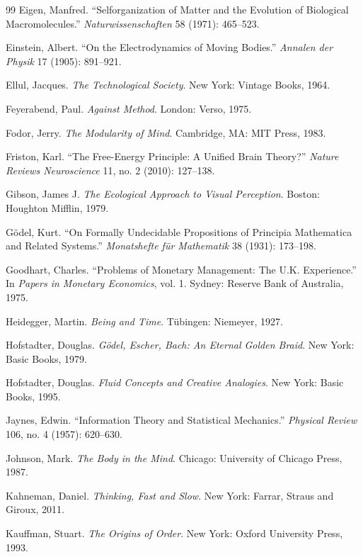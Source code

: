 \documentclass[12pt,openany]{book}
\theoremstyle{plain}
\theoremstyle{definition}
\theoremstyle{remark}
\begin{document}
\begin{thebibliography}{99}
Eigen, Manfred.
``Selforganization of Matter and the Evolution of Biological Macromolecules.''
\textit{Naturwissenschaften} 58 (1971): 465--523.

Einstein, Albert.
``On the Electrodynamics of Moving Bodies.''
\textit{Annalen der Physik} 17 (1905): 891--921.

Ellul, Jacques.
\textit{The Technological Society}.
New York: Vintage Books, 1964.

Feyerabend, Paul.
\textit{Against Method}.
London: Verso, 1975.

Fodor, Jerry.
\textit{The Modularity of Mind}.
Cambridge, MA: MIT Press, 1983.

Friston, Karl.
``The Free-Energy Principle: A Unified Brain Theory?''
\textit{Nature Reviews Neuroscience} 11, no. 2 (2010): 127--138.

Gibson, James J.
\textit{The Ecological Approach to Visual Perception}.
Boston: Houghton Mifflin, 1979.

Gödel, Kurt.
``On Formally Undecidable Propositions of Principia Mathematica and Related Systems.''
\textit{Monatshefte für Mathematik} 38 (1931): 173--198.

Goodhart, Charles.
``Problems of Monetary Management: The U.K. Experience.''
In \textit{Papers in Monetary Economics}, vol. 1.
Sydney: Reserve Bank of Australia, 1975.

Heidegger, Martin.
\textit{Being and Time}.
Tübingen: Niemeyer, 1927.

Hofstadter, Douglas.
\textit{Gödel, Escher, Bach: An Eternal Golden Braid}.
New York: Basic Books, 1979.

Hofstadter, Douglas.
\textit{Fluid Concepts and Creative Analogies}.
New York: Basic Books, 1995.

Jaynes, Edwin.
``Information Theory and Statistical Mechanics.''
\textit{Physical Review} 106, no. 4 (1957): 620--630.

Johnson, Mark.
\textit{The Body in the Mind}.
Chicago: University of Chicago Press, 1987.

Kahneman, Daniel.
\textit{Thinking, Fast and Slow}.
New York: Farrar, Straus and Giroux, 2011.

Kauffman, Stuart.
\textit{The Origins of Order}.
New York: Oxford University Press, 1993.


\end{thebibliography}
\end{document}

